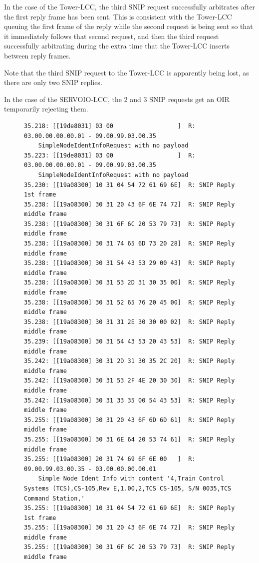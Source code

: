 \documentclass[11pt]{article}
\begin{document}
In the case of the Tower-LCC, the third SNIP request successfully arbitrates after the
first reply frame has been sent.  This is consistent with the Tower-LCC queuing the 
first frame of the reply while the second request is being sent so that it immediately
follows that second request, 
and then the third request successfully arbitrating during the extra
time that the Tower-LCC inserts between reply frames.

Note that the third SNIP request to the Tower-LCC is apparently
being lost, as there are only two SNIP replies.

In the case of the SERVOIO-LCC, the 2 and 3
SNIP requests get an OIR temporarily rejecting them.

\begin{figure}[!htbp]
\begin{verbatim}
35.218: [[19de8031] 03 00                  ]  R: 03.00.00.00.00.01 - 09.00.99.03.00.35 
    SimpleNodeIdentInfoRequest with no payload
35.223: [[19de8031] 03 00                  ]  R: 03.00.00.00.00.01 - 09.00.99.03.00.35 
    SimpleNodeIdentInfoRequest with no payload
35.230: [[19a08300] 10 31 04 54 72 61 69 6E]  R: SNIP Reply 1st frame
35.238: [[19a08300] 30 31 20 43 6F 6E 74 72]  R: SNIP Reply middle frame
35.238: [[19a08300] 30 31 6F 6C 20 53 79 73]  R: SNIP Reply middle frame
35.238: [[19a08300] 30 31 74 65 6D 73 20 28]  R: SNIP Reply middle frame
35.238: [[19a08300] 30 31 54 43 53 29 00 43]  R: SNIP Reply middle frame
35.238: [[19a08300] 30 31 53 2D 31 30 35 00]  R: SNIP Reply middle frame
35.238: [[19a08300] 30 31 52 65 76 20 45 00]  R: SNIP Reply middle frame
35.238: [[19a08300] 30 31 31 2E 30 30 00 02]  R: SNIP Reply middle frame
35.239: [[19a08300] 30 31 54 43 53 20 43 53]  R: SNIP Reply middle frame
35.242: [[19a08300] 30 31 2D 31 30 35 2C 20]  R: SNIP Reply middle frame
35.242: [[19a08300] 30 31 53 2F 4E 20 30 30]  R: SNIP Reply middle frame
35.242: [[19a08300] 30 31 33 35 00 54 43 53]  R: SNIP Reply middle frame
35.255: [[19a08300] 30 31 20 43 6F 6D 6D 61]  R: SNIP Reply middle frame
35.255: [[19a08300] 30 31 6E 64 20 53 74 61]  R: SNIP Reply middle frame
35.255: [[19a08300] 20 31 74 69 6F 6E 00   ]  R: 09.00.99.03.00.35 - 03.00.00.00.00.01 
    Simple Node Ident Info with content '4,Train Control Systems (TCS),CS-105,Rev E,1.00,2,TCS CS-105, S/N 0035,TCS Command Station,'
35.255: [[19a08300] 10 31 04 54 72 61 69 6E]  R: SNIP Reply 1st frame
35.255: [[19a08300] 30 31 20 43 6F 6E 74 72]  R: SNIP Reply middle frame
35.255: [[19a08300] 30 31 6F 6C 20 53 79 73]  R: SNIP Reply middle frame

\end{verbatim}
\end{figure}
\end{document}
